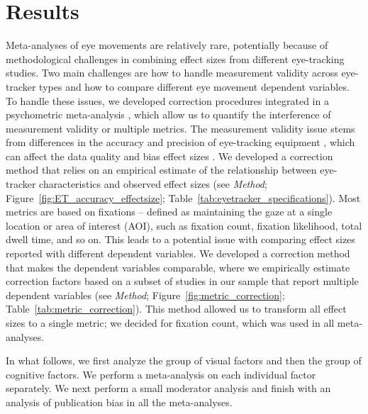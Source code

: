 
\section{Results}

Meta-analyses of eye movements are relatively rare, potentially because of methodological challenges in combining effect sizes from different eye-tracking studies. Two main challenges are how to handle measurement validity across eye-tracker types and how to compare different eye movement dependent variables. To handle these issues, we developed correction procedures integrated in a psychometric meta-analysis \citep{hunter2004a}, which allow us to quantify the interference of measurement validity or multiple metrics. The measurement validity issue stems from differences in the accuracy and precision of eye-tracking equipment \citep{holmqvist2015a}, which can affect the data quality and bias effect sizes \citep{orquin2016a}. We developed a correction method that relies on an empirical estimate of the relationship between eye-tracker characteristics and observed effect sizes (see \textit{Method}; Figure~\ref{fig:ET_accuracy_effectsize}; Table~\ref{tab:eyetracker_specifications}). Most metrics are based on fixations -- defined as maintaining the gaze at a single location or area of interest (AOI), such as fixation count, fixation likelihood, total dwell time, and so on. This leads to a potential issue with comparing effect sizes reported with different dependent variables. We developed a correction method that makes the dependent variables comparable, where we empirically estimate correction factors based on a subset of studies in our sample that report multiple dependent variables (see \textit{Method}; Figure~\ref{fig:metric_correction}; Table~\ref{tab:metric_correction}). This method allowed us to transform all effect sizes to a single metric; we decided for fixation count, which was used in all meta-analyses. 


In what follows, we first analyze the group of visual factors and then the group of cognitive factors. We perform a meta-analysis on each individual factor  separately. We next perform a small moderator analysis and finish with an analysis of publication bias in all the meta-analyses.


